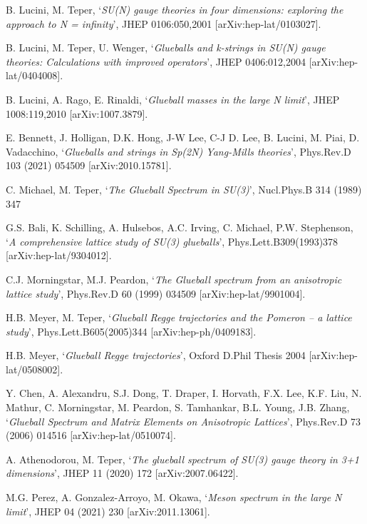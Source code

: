 \documentclass[12pt]{article}
\begin{document}
%
%
%
\begin{thebibliography}{99}


B. Lucini, M. Teper,
  `{\it  SU(N) gauge theories in four dimensions: exploring the approach to N = infinity}',
   JHEP 0106:050,2001 [arXiv:hep-lat/0103027].

B. Lucini, M. Teper, U. Wenger,
`{\it Glueballs and k-strings in SU(N) gauge theories: Calculations with improved operators}',
JHEP 0406:012,2004 [arXiv:hep-lat/0404008].

B. Lucini, A. Rago, E. Rinaldi,
`{\it Glueball masses in the large N limit}',
JHEP 1008:119,2010 [arXiv:1007.3879].

  E. Bennett, J. Holligan, D.K. Hong, J-W Lee, C-J D. Lee, B. Lucini, M. Piai, D. Vadacchino,
  `{\it Glueballs and strings in Sp(2N) Yang-Mills theories}',
   Phys.Rev.D 103 (2021) 054509 [arXiv:2010.15781].
 
  C. Michael, M. Teper,
  `{\it The Glueball Spectrum in SU(3)}',
  Nucl.Phys.B 314 (1989) 347

  G.S. Bali, K. Schilling, A. Hulsebos, A.C. Irving, C. Michael, P.W. Stephenson,
  `{\it A comprehensive lattice study of SU(3) glueballs}',
  Phys.Lett.B309(1993)378 [arXiv:hep-lat/9304012].
  
  C.J. Morningstar, M.J. Peardon,
  `{\it The Glueball spectrum from an anisotropic lattice study}',
  Phys.Rev.D 60 (1999) 034509 [arXiv:hep-lat/9901004].
  
  H.B. Meyer, M. Teper,
  `{\it Glueball Regge trajectories and the Pomeron -- a lattice study}',
  Phys.Lett.B605(2005)344 [arXiv:hep-ph/0409183].
  
  H.B. Meyer,
  `{\it Glueball Regge trajectories}',
  Oxford D.Phil Thesis 2004 [arXiv:hep-lat/0508002].

  Y. Chen, A. Alexandru, S.J. Dong, T. Draper, I. Horvath, F.X. Lee, K.F. Liu, N. Mathur,
C. Morningstar, M. Peardon, S. Tamhankar, B.L. Young, J.B. Zhang,
  `{\it Glueball Spectrum and Matrix Elements on Anisotropic Lattices}',
  Phys.Rev.D 73 (2006) 014516 [arXiv:hep-lat/0510074].
  
  A. Athenodorou, M. Teper,
  `{\it The glueball spectrum of SU(3) gauge theory in 3+1 dimensions}',
  JHEP 11 (2020) 172 [arXiv:2007.06422].

  M.G. Perez, A. Gonzalez-Arroyo, M. Okawa,
  `{\it Meson spectrum in the large N limit}',
  JHEP 04 (2021) 230 [arXiv:2011.13061].


\end{thebibliography}
\end{document}
